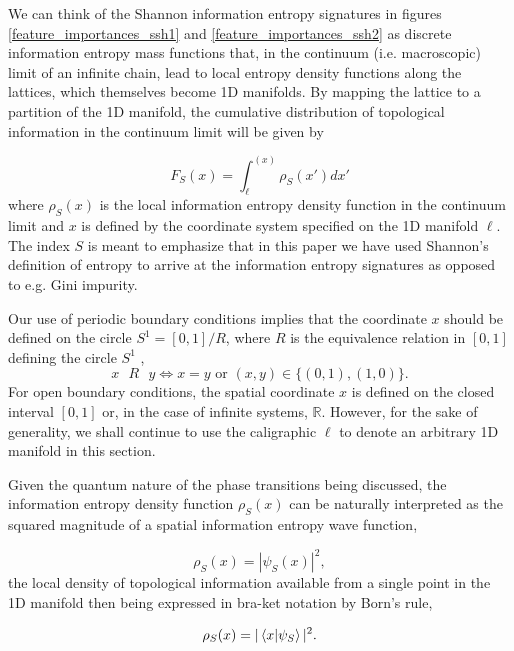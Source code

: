 \documentclass[10pt]{revtex4-1}
\begin{document}
We can think of the Shannon information entropy signatures in figures \ref{feature_importances_ssh1} and \ref{feature_importances_ssh2} as discrete information entropy mass functions that, in the continuum (i.e. macroscopic) limit of an infinite chain, lead to local entropy density functions along the lattices, which themselves become 1D manifolds. By mapping the lattice to a  partition of the 1D manifold, the cumulative distribution of topological information in the continuum limit will be given by

\begin{equation}
\label{entropy_density}
F_S(x) = \int_{\ell}^{(x)}\rho_S(x')dx'
\end{equation}
where $\rho_S(x)$ is the local information entropy density function in the continuum limit and $x$ is defined by the coordinate system specified on the 1D manifold $\ell$. The index $S$ is meant to emphasize that in this paper we have used Shannon's definition of entropy to arrive at the information entropy signatures as opposed to e.g. Gini impurity. 

Our use of periodic boundary conditions implies that the coordinate $x$ should be defined on the circle $ S^1 = [0, 1]/R$, where $R$ is the equivalence relation in $[0,1]$ defining the circle $S^1$ , 
\begin{equation}
x \text{ } R \text{ } y \iff x=y \text{ or } (x,y)\in \{(0,1), (1,0)\}.
\end{equation}
For open boundary conditions, the spatial coordinate $x$ is defined on the closed interval $[0,1]$ or, in the case of infinite systems, $\mathbb{R}$. However, for the sake of generality, we shall continue to use the caligraphic $\ell$ to denote an arbitrary 1D manifold in this section. 

Given the quantum nature of the phase transitions being discussed, the information entropy density function $\rho_S(x)$ can be naturally interpreted as the squared magnitude of a spatial information entropy wave function,

\begin{equation}
\label{shannon_wave_function}
\rho_S(x) = |\psi_S(x)|^2,
\end{equation}
the local density of topological information available from a single point in the 1D manifold then being expressed in bra-ket notation by Born's rule,  

\begin{equation}
\label{born_rule_spatial}
\rho_S(x) = |\braket{x|\psi_S}|^2.
\end{equation}
\end{document}
